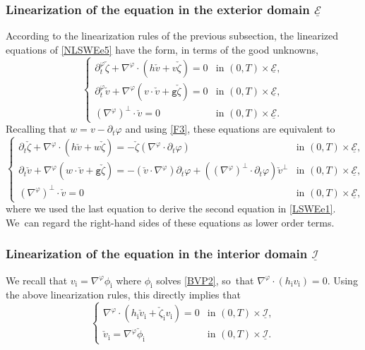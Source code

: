 \documentclass[11pt]{article}
\newcommand{\gr}{{\mathtt g}}
\newcommand{\dt}{\partial_t}
\newcommand{\cI}{{\mathcal I}}
\newcommand{\cE}{{\mathcal E}}
\newcommand{\ul}[1]{\underline{#1}}
\theoremstyle{definition}
\begin{document}
\subsubsection{Linearization of the equation in the exterior domain $\ul{\cE}$}
According to the linearization rules of the previous subsection, the linearized equations of \eqref{NLSWEe5} have the form, in terms of the good unknowns,
\[\begin{cases}
\dt^\varphi\check{\zeta}+\nabla^\varphi\cdot(h\check{v}+v\check{\zeta}) = 0 &\text{in } (0,T)\times\ul{\cE}, \\
\dt^\varphi\check{v}+\nabla^\varphi(v\cdot\check{v}+\gr\check{\zeta}) = 0 &\text{in } (0,T)\times\ul{\cE}, \\
(\nabla^\varphi)^\perp\cdot\check{v} = 0 &\text{in } (0,T)\times\ul{\cE}.
\end{cases}
\]
Recalling that $w=v-\dt\varphi$ and using \eqref{F3}, these equations are equivalent to
\begin{equation}\label{LSWEe1}
\begin{cases}
\dt\check{\zeta}+\nabla^\varphi\cdot(h\check{v}+w\check{\zeta}) = -\check{\zeta}(\nabla^\varphi\cdot\dt\varphi) &\text{in } (0,T)\times\ul{\cE}, \\
\dt\check{v}+\nabla^\varphi(w\cdot\check{v}+\gr\check{\zeta}) = -(\check{v}\cdot\nabla^\varphi)\dt\varphi+((\nabla^\varphi)^\perp\cdot\dt\varphi)\check{v}^\perp
&\text{in } (0,T)\times\ul{\cE}, \\
(\nabla^\varphi)^\perp\cdot\check{v} = 0 &\text{in } (0,T)\times\ul{\cE},
\end{cases}
\end{equation}
where we used the last equation to derive the second equation in \eqref{LSWEe1}. We~can regard the right-hand sides of these equations as lower order terms.

\subsubsection{Linearization of the equation in the interior domain $\ul{\cI}$}
We recall that $v_\mathrm{i}=\nabla^\varphi\phi_\mathrm{i}$ where $\phi_\mathrm{i}$ solves \eqref{BVP2}, so~that $\nabla^\varphi\cdot(h_\mathrm{i}v_\mathrm{i})=0$.
Using the above linearization rules, this directly implies that
\begin{equation}\label{LSWEi1}
\begin{cases}
\nabla^\varphi\cdot(h_\mathrm{i}\check{v}_\mathrm{i}+\check{\zeta}_\mathrm{i} v_\mathrm{i}) = 0 &\text{in } (0,T)\times\ul{\cI}, \\
\check{v}_\mathrm{i}=\nabla^\varphi\check{\phi}_\mathrm{i} &\text{in } (0,T)\times\ul{\cI}.
\end{cases}
\end{equation}
\end{document}
